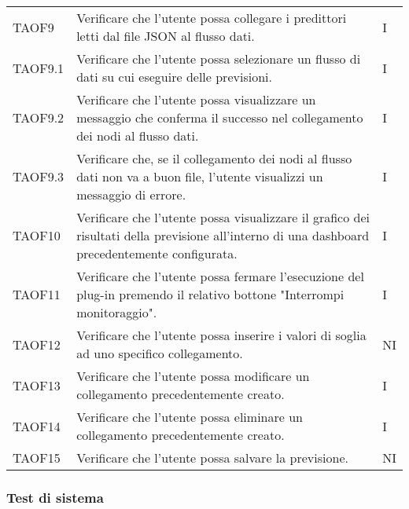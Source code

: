 \begin{longtable}{C{2.5cm} L{8cm} C{2cm}}
TAOF9 & Verificare che l’utente possa collegare i predittori letti dal file JSON al flusso dati. & I \\
TAOF9.1 & Verificare che l’utente possa selezionare un flusso di dati su cui eseguire delle previsioni. & I\\
TAOF9.2 & Verificare che l’utente possa visualizzare un messaggio che conferma il successo nel collegamento dei nodi al flusso dati. & I\\
TAOF9.3 & Verificare che, se il collegamento dei nodi al flusso dati non va a buon file, l’utente visualizzi un messaggio di errore. & I \\
TAOF10 & Verificare che l’utente possa visualizzare il grafico dei risultati della previsione all’interno di una dashboard precedentemente configurata. & I\\
TAOF11 & Verificare che l’utente possa fermare l’esecuzione del plug-in premendo il relativo bottone "Interrompi monitoraggio". & I \\
TAOF12 & Verificare che l'utente possa inserire i valori di soglia ad uno specifico collegamento. & NI \\
TAOF13 & Verificare che l'utente possa modificare un collegamento precedentemente creato. & I \\
TAOF14 & Verificare che l'utente possa eliminare un collegamento precedentemente creato. & I \\
TAOF15 & Verificare che l'utente possa salvare la previsione. & NI \\

\end{longtable}

\subsubsection{Test di sistema}

